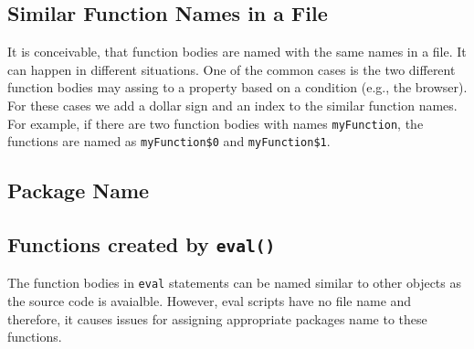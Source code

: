 \documentclass{acm_proc_article-sp}
\begin{document}
{\begin{table}
\centering
\caption{JavaScript Expression Reduction to Name.}
 \label{expression-reduction} 
\end{table}    

\subsection{Similar Function Names in a File}
It is conceivable, that function bodies are named with the same names in a file. It can happen in different situations. One of the common cases is the two different function bodies may assing to a property based on a condition (e.g., the browser). For these cases we add a dollar sign and an index to the similar function names. For example, if there are two function bodies with names {\small\texttt{myFunction}}, the functions are named as {\small\texttt{myFunction\$0}} and {\small\texttt{myFunction\$1}}. 


\subsection{Package Name}

\subsection{Functions created by {\large \texttt{eval()}}}}
The function bodies in {\small\texttt{eval}} statements can be named similar to other objects as the source code is avaialble. However, eval scripts have no file name and therefore, it causes issues for assigning appropriate packages name to these functions. 
\end{document}
